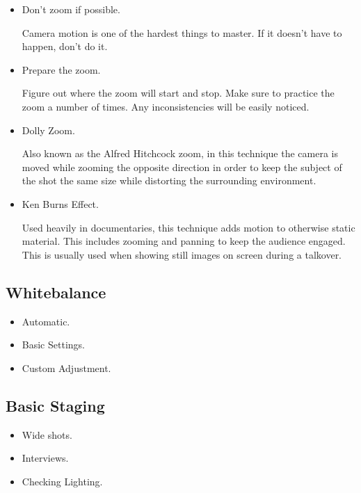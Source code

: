 \documentclass[letterpaper]{latexclasses/tmarticle}
\begin{document}
\begin{itemize}
    \item
    Don't zoom if possible.
    
    Camera motion is one of the hardest things to master.  If it doesn't have to
    happen, don't do it.
    
    \item
    Prepare the zoom.
    
    Figure out where the zoom will start and stop.  Make sure to practice the
    zoom a number of times.  Any inconsistencies will be easily noticed.
    
    \item
    Dolly Zoom.
    
    Also known as the Alfred Hitchcock zoom, in this technique the camera is
    moved while zooming the opposite direction in order to keep the subject of
    the shot the same size while distorting the surrounding environment.
    
    \item
    Ken Burns Effect.
    
    Used heavily in documentaries, this technique adds motion to otherwise
    static material.  This includes zooming and panning to keep the audience
    engaged.  This is usually used when showing still images on screen during a
    talkover.

\end{itemize}

\subsection{Whitebalance}

\begin{itemize}
    \item
    Automatic.
    
    \item
    Basic Settings.
    
    \item
    Custom Adjustment.

\end{itemize}

\subsection{Basic Staging}

\begin{itemize}
    \item
    Wide shots.
    
    \item
    Interviews.
    
    \item
    Checking Lighting.

\end{itemize}
\end{document}
